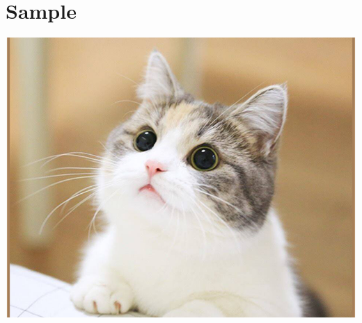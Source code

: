 \documentclass{standalone} %
\begin{document}
	\section{Sample}
	\lipsum[1]
	\begin{center}
		\includegraphics[width=\textwidth,height=\textheight,keepaspectratio]{Pictures/cutecat.png}
	\end{center}
\end{document}
